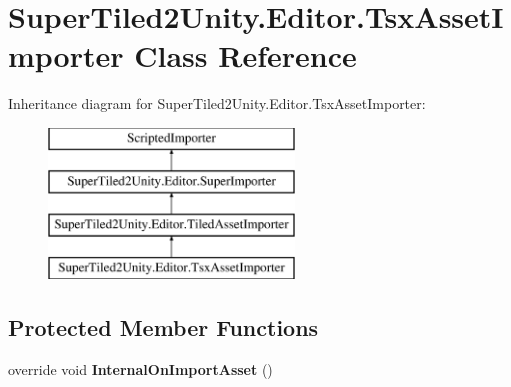 \hypertarget{class_super_tiled2_unity_1_1_editor_1_1_tsx_asset_importer}{}\section{Super\+Tiled2\+Unity.\+Editor.\+Tsx\+Asset\+Importer Class Reference}
\label{class_super_tiled2_unity_1_1_editor_1_1_tsx_asset_importer}
Inheritance diagram for Super\+Tiled2\+Unity.\+Editor.\+Tsx\+Asset\+Importer\+:\begin{figure}[H]
\begin{center}
\leavevmode
\includegraphics[height=4.000000cm]{class_super_tiled2_unity_1_1_editor_1_1_tsx_asset_importer}
\end{center}
\end{figure}
\subsection*{Protected Member Functions}
\begin{DoxyCompactItemize}
\item 
\mbox{\label{class_super_tiled2_unity_1_1_editor_1_1_tsx_asset_importer_a1a4574732506e380b1daa3683ed4d413}} 
override void {\bfseries Internal\+On\+Import\+Asset} ()
\end{DoxyCompactItemize}
